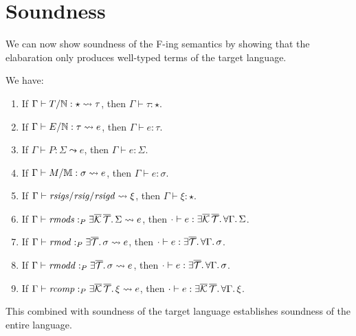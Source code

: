 \documentclass{article}
\begin{document}
\section{Soundness}

We can now show soundness of the F-ing semantics by showing that the
elabaration only produces well-typed terms of the target language.

\begin{theorem}
We have:
\begin{enumerate}
    \item If $\Gamma \vdash T/\mathbb{N} : \star \leadsto \tau$, then $\Gamma \vdash \tau : \star$.
    \item If $\Gamma \vdash E/\mathbb{N} : \tau \leadsto e$, then $\Gamma \vdash e : \tau$.
    \item If $\Gamma \vdash P : \Sigma \leadsto e$, then $\Gamma \vdash e : \Sigma$.
    \item If $\Gamma \vdash M/\mathbb{M} : \sigma \leadsto e$, then $\Gamma \vdash e : \sigma$.
    \item If $\Gamma \vdash \mathit{rsigs}/\mathit{rsig}/\mathit{rsigd} \leadsto \xi$, then $\Gamma \vdash \xi : \star$.
    \item If $\Gamma \vdash \mathit{rmods} :_P \exists \overline{\mathcal{K}}\, \overline{\mathcal{T}}.\, \Sigma \leadsto e$, then $\cdot \vdash e : \exists \overline{\mathcal{K}}\, \overline{\mathcal{T}}.\, \forall \Gamma.\, \Sigma$.
    \item If $\Gamma \vdash \mathit{rmod} :_P \exists \overline{\mathcal{T}}.\, \sigma \leadsto e$, then $\cdot \vdash e : \exists \overline{\mathcal{T}}.\, \forall \Gamma.\, \sigma$.
    \item If $\Gamma \vdash \mathit{rmodd} :_P \exists \overline{\mathcal{T}}.\, \sigma \leadsto e$, then $\cdot \vdash e : \exists \overline{\mathcal{T}}.\, \forall \Gamma.\, \sigma$.
    \item If $\Gamma \vdash \mathit{rcomp} :_P \exists \overline{\mathcal{K}}\, \overline{\mathcal{T}}.\, \xi \leadsto e$, then $\cdot \vdash e : \exists \overline{\mathcal{K}}\, \overline{\mathcal{T}}.\, \forall \Gamma.\, \xi$.
\end{enumerate}
\end{theorem}

This combined with soundness of the target language establishes soundness of the
entire language.
\end{document}
